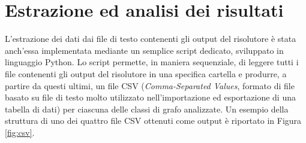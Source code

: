 


\section{Estrazione ed analisi dei risultati}
L'estrazione dei dati dai file di testo contenenti gli output del risolutore è stata anch'essa implementata mediante un semplice script dedicato, sviluppato in linguaggio Python. Lo script permette, in maniera sequenziale, di leggere tutti i file contenenti gli output del risolutore in una specifica cartella e produrre, a partire da questi ultimi, un file CSV (\textit{Comma-Separated Values}, formato di file basato su file di testo molto utilizzato nell'importazione ed esportazione di una tabella di dati) per ciascuna delle classi di grafo analizzate. Un esempio della struttura di uno dei quattro file CSV ottenuti come output è riportato in Figura \ref{fig:csv}.

